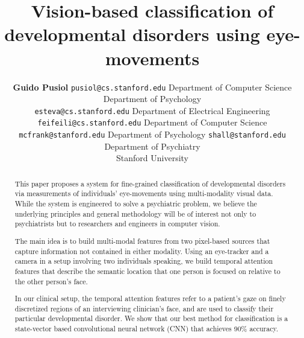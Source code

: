 \documentclass[10pt,twocolumn,letterpaper]{article}
\begin{document}
\title{Vision-based classification of developmental disorders using eye-movements}

\author{{\bf Guido Pusiol}
\texttt{pusiol@cs.stanford.edu}
Department of Computer Science\\
Department of Psychology \\
\texttt{esteva@cs.stanford.edu} 
Department of Electrical Engineering
\texttt{feifeili@cs.stanford.edu} 
Department of Computer Science
\texttt{mcfrank@stanford.edu}
Department of Psychology
\texttt{shall@stanford.edu}\\
  Department of Psychiatry\\
Stanford University}
  

\maketitle

\begin{abstract}
This paper proposes a system for fine-grained classification of developmental disorders via measurements of individuals' eye-movements using multi-modality visual data. While the system is engineered to solve a psychiatric problem, we believe the underlying principles and general methodology will be of interest not only to psychiatrists but to researchers and engineers in computer vision. 

The main idea is to build multi-modal features from two pixel-based sources that capture information not contained in either modality. Using an eye-tracker and a camera in a setup involving two individuals speaking, we build temporal attention features that describe the semantic location that one person is focused on relative to the other person's face. 

In our clinical setup, the temporal attention features refer to a patient's gaze on finely discretized regions of an interviewing clinician's face, and are used to classify their particular developmental disorder. We show that our best method for classification is a state-vector based convolutional neural network (CNN) that achieves 90\% accuracy.  



\end{abstract}
   
\end{document}
